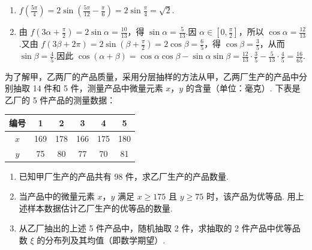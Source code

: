 \begin{solution}
\begin{enumerate}
\item \(f\left(\frac{5\pi}{4}\right)=2\sin\left(\frac{5\pi}{12}-\frac{\pi}{6}\right)=2\sin\frac{\pi}{4}=\sqrt{2}\).
\item 由 \(f\left(3\alpha+\frac{\pi}{2}\right)=2\sin\alpha=\frac{10}{13}\)，得 \(\sin\alpha=\frac{5}{13}\).因 \(\alpha\in\left[0,\frac{\pi}{2}\right]\)，所以 \(\cos\alpha=\frac{12}{13}\).又由 \(f(3\beta+2\pi)=2\sin\left(\beta+\frac{\pi}{2}\right)=2\cos\beta=\frac{6}{5}\)，得 \(\cos\beta=\frac35\)，从而 \(\sin\beta=\frac45\).因此 \(\cos(\alpha+\beta)=\cos\alpha\cos\beta-\sin\alpha\sin\beta=\frac{12}{13}\cdot\frac35-\frac5{13}\cdot\frac45=\frac{16}{65}\).
\end{enumerate}
\end{solution}

\begin{problem}
为了解甲，乙两厂的产品质量，采用分层抽样的方法从甲，乙两厂生产的产品中分别抽取 14 件和 5 件，测量产品中微量元素 \(x\)，\(y\) 的含量（单位：毫克）. 下表是乙厂的 5 件产品的测量数据：

\begin{center}
\begin{tabular}{|c|c|c|c|c|c|}
\hline
编号 & 1 & 2 & 3 & 4 & 5 \\
\hline
\(x\) & 169 & 178 & 166 & 175 & 180 \\
\hline
\(y\) & 75 & 80 & 77 & 70 & 81 \\
\hline
\end{tabular}
\end{center}

\begin{enumerate}
\item 已知甲厂生产的产品共有 98 件，求乙厂生产的产品数量.
\item 当产品中的微量元素 \(x\)，\(y\) 满足 \(x \geqslant 175\) 且 \(y \geqslant 75\) 时，该产品为优等品. 用上述样本数据估计乙厂生产的优等品的数量.
\item 从乙厂抽出的上述 5 件产品中，随机抽取 2 件，求抽取的 2 件产品中优等品数 \(\xi\) 的分布列及其均值（即数学期望）.
\end{enumerate}
\end{problem}


